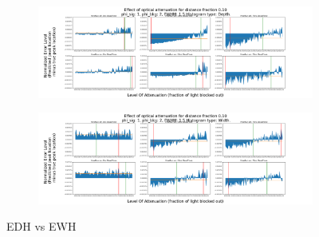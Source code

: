 \documentclass{beamer}
\begin{document}
\begin{frame}
  \begin{figure}[H]
    \centering
    \begin{subfigure}[b]{1\textwidth}
      \includegraphics[width=1\linewidth]{depthExample.png}
      \label{fig:Depth Example}
    \end{subfigure}
    \begin{subfigure}[b]{1\textwidth}
      \includegraphics[width=1\linewidth]{widthExample.png}
      \label{fig:Width Example}
    \end{subfigure}
    \caption{\label{fig:histogramComparison}EDH vs EWH}
  \end{figure}
\end{frame}
\end{document}
